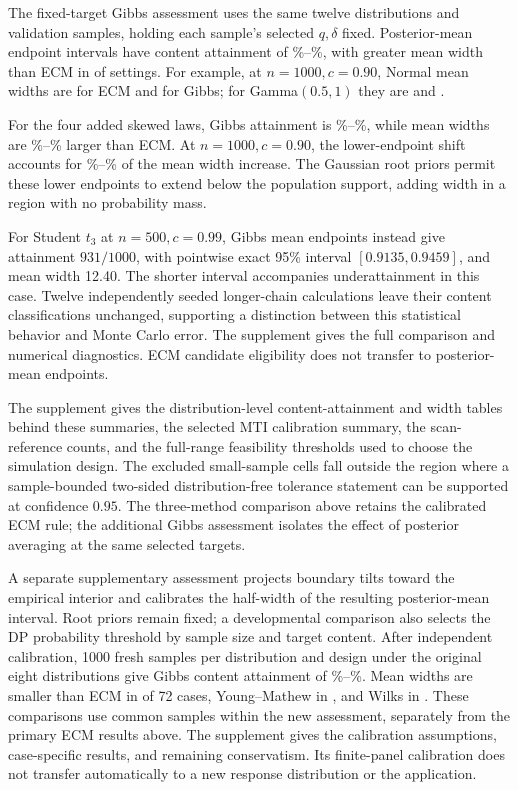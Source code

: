 \documentclass[11pt]{article}
\numberwithin{equation}{section}
\begin{document}
The fixed-target Gibbs assessment uses the same twelve distributions and
\MTIGibbsExpandedSamples{} validation samples,
holding each sample's selected \(q,\delta\) fixed. Posterior-mean endpoint
intervals have content attainment of \MTIGibbsExpandedMin\%--\MTIGibbsExpandedMax\%,
with greater mean width than ECM in \MTIGibbsExpandedWider{} of
\MTIGibbsExpandedCases{} settings.
For example, at \(n=1000,c=0.90\), Normal mean widths are
\MTIFullNormalECM{} for ECM and \MTIFullNormalGibbs{} for Gibbs; for
Gamma\((0.5,1)\) they are \MTIFullGammaECM{} and \MTIFullGammaGibbs{}.

For the four added skewed laws, Gibbs attainment is
\MTIGibbsAddedMin\%--\MTIGibbsAddedMax\%, while mean widths are
\MTIGibbsAddedWidthMin\%--\MTIGibbsAddedWidthMax\% larger than ECM.
At \(n=1000,c=0.90\), the lower-endpoint shift accounts for
\MTIGibbsLowerShareMin\%--\MTIGibbsLowerShareMax\% of the mean width
increase. The Gaussian root priors permit these lower endpoints to extend
below the population support, adding width in a region with no probability
mass.

For Student \(t_3\) at \(n=500,c=0.99\), Gibbs mean endpoints instead give
attainment \(931/1000\), with pointwise exact 95\% interval
\([0.9135,0.9459]\), and mean width 12.40. The shorter interval accompanies
underattainment in this case. Twelve independently seeded longer-chain
calculations leave their content classifications unchanged, supporting a
distinction between this statistical behavior and Monte Carlo error.
The supplement gives the full comparison and numerical diagnostics.
ECM candidate eligibility does not transfer to posterior-mean endpoints.

The supplement gives the distribution-level content-attainment and width tables behind these
summaries, the selected MTI calibration summary, the scan-reference counts,
and the full-range feasibility thresholds used to choose the simulation design.
The excluded small-sample cells fall outside the region where a sample-bounded
two-sided distribution-free tolerance statement can be supported at confidence \(0.95\).
The three-method comparison above retains the calibrated ECM rule; the
additional Gibbs assessment isolates the effect of posterior averaging at
the same selected targets.

A separate supplementary assessment projects boundary tilts toward the
empirical interior and calibrates the half-width of the resulting
posterior-mean interval. Root priors remain fixed; a developmental comparison
also selects the DP probability threshold by sample size and target content.
After independent calibration, 1000 fresh samples per distribution and design
under the original eight distributions
give Gibbs content attainment of
\MTIDecisionAttainmentMin\%--\MTIDecisionAttainmentMax\%.
Mean widths are smaller than ECM in \MTIDecisionShorterECM{} of 72 cases,
Young--Mathew in \MTIDecisionShorterYM{}, and Wilks in
\MTIDecisionShorterWilks{}. These comparisons use common samples within
the new assessment, separately from the primary ECM results above.
The supplement gives the calibration assumptions, case-specific results,
and remaining conservatism. Its finite-panel calibration does not transfer
automatically to a new response distribution or the application.
\end{document}

